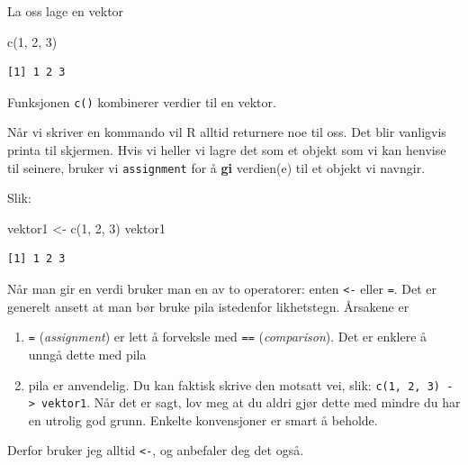 \documentclass[
  letterpaper,
  DIV=11,
  numbers=noendperiod]{scrartcl}
\newenvironment{Shaded}{\begin{snugshade}}{\end{snugshade}}
\newcommand{\DecValTok}[1]{\textcolor[rgb]{0.68,0.00,0.00}{#1}}
\newcommand{\FunctionTok}[1]{\textcolor[rgb]{0.28,0.35,0.67}{#1}}
\newcommand{\NormalTok}[1]{\textcolor[rgb]{0.00,0.23,0.31}{#1}}
\newcommand{\OtherTok}[1]{\textcolor[rgb]{0.00,0.23,0.31}{#1}}
\providecommand{\tightlist}{%
  \setlength{\itemsep}{0pt}\setlength{\parskip}{0pt}}\usepackage{longtable,booktabs,array}
\begin{document}
La oss lage en vektor

\begin{Shaded}
\begin{Highlighting}[]
\FunctionTok{c}\NormalTok{(}\DecValTok{1}\NormalTok{, }\DecValTok{2}\NormalTok{, }\DecValTok{3}\NormalTok{)}
\end{Highlighting}
\end{Shaded}

\begin{verbatim}
[1] 1 2 3
\end{verbatim}

Funksjonen \texttt{c()} kombinerer verdier til en vektor.

Når vi skriver en kommando vil R alltid returnere noe til oss. Det blir
vanligvis printa til skjermen. Hvis vi heller vi lagre det som et objekt
som vi kan henvise til seinere, bruker vi \texttt{assignment} for å
\textbf{gi} verdien(e) til et objekt vi navngir.

Slik:

\begin{Shaded}
\begin{Highlighting}[]
\NormalTok{vektor1 }\OtherTok{\textless{}{-}} \FunctionTok{c}\NormalTok{(}\DecValTok{1}\NormalTok{, }\DecValTok{2}\NormalTok{, }\DecValTok{3}\NormalTok{)}
\NormalTok{vektor1}
\end{Highlighting}
\end{Shaded}

\begin{verbatim}
[1] 1 2 3
\end{verbatim}

\begin{tcolorbox}[enhanced jigsaw, toptitle=1mm, colback=white, colbacktitle=quarto-callout-note-color!10!white, coltitle=black, leftrule=.75mm, bottomtitle=1mm, left=2mm, opacitybacktitle=0.6, toprule=.15mm, titlerule=0mm, title=\textcolor{quarto-callout-note-color}{\faInfo}\hspace{0.5em}{Note}, bottomrule=.15mm, arc=.35mm, colframe=quarto-callout-note-color-frame, breakable, opacityback=0, rightrule=.15mm]

Når man gir en verdi bruker man en av to operatorer: enten
\texttt{\textless{}-} eller \texttt{=}. Det er generelt ansett at man
bør bruke pila istedenfor likhetstegn. Årsakene er

\begin{enumerate}
\def\labelenumi{\arabic{enumi}.}
\tightlist
\item
  \texttt{=} (\emph{assignment}) er lett å forveksle med \texttt{==}
  (\emph{comparison}). Det er enklere å unngå dette med pila
\item
  pila er anvendelig. Du kan faktisk skrive den motsatt vei, slik:
  \texttt{c(1,\ 2,\ 3)\ -\textgreater{}\ vektor1}. Når det er sagt, lov
  meg at du aldri gjør dette med mindre du har en utrolig god grunn.
  Enkelte konvensjoner er smart å beholde.
\end{enumerate}

Derfor bruker jeg alltid \texttt{\textless{}-}, og anbefaler deg det
også.

\end{tcolorbox}
\end{document}
